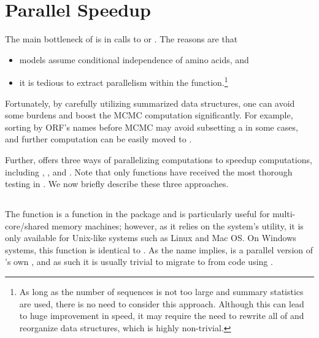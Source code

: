 
\section[Parallel Speedup]{Parallel Speedup}
\label{sec:speedup}

The main bottleneck of  is in calls to  or
. The reasons are that
\begin{itemize}
\item models assume conditional independence of amino acids, and
\item it is tedious to extract parallelism within the 
 function.\footnote{
As long as the number of sequences is not too large and summary statistics are
used, there is no need to consider this approach. Although this can lead to
huge improvement in speed, it may require the need to rewrite all of
 and reorganize data structures, which is highly non-trivial.
}
\end{itemize}
Fortunately, by carefully utilizing summarized data structures, one can avoid 
some burdens and boost the MCMC computation significantly. For example, 
sorting by ORF's names before MCMC may avoid subsetting a  in 
some cases, and further computation can be easily moved to .

Further,  offers three ways of parallelizing computations to
speedup computations, including
, , and
. Note that only  functions have
received the most thorough testing in .  We now briefly describe 
these three approaches.


\subsection[mclapply()]{}
\label{sec:mclapply}

The function 
is a function in the  package and is particularly useful for
multi-core/shared memory machines; however, as it relies on the system's 
 utility, it is only available for Unix-like systems such
as Linux and Mac OS.
On Windows systems, this function is identical to .
As the name implies,  is a parallel version of 's 
own , and as such it is usually trivial to migrate to 
 from code using .

